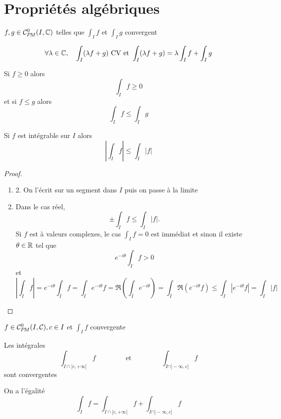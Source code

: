\section{Propriétés algébriques}

\begin{prop}
    \Hyp $f,g\in\CPM(I, \C)$ telles que $\displaystyle \int_If$ et $\displaystyle \int_Ig$ convergent
    \begin{concenum}
    \item \[
            \forall \lambda\in\mathbb C, \quad \int_I(\lambda f+g)\text{ CV  et }\int_I(\lambda f+g)=\lambda\int_If+\int_Ig
        \]
    \item Si $f\geq 0$ alors \[
            \int_If\geq 0
        \]
        et si $f\leq g$ alors \[
            \int_If\leq \int_Ig
        \]
    \item Si $f$ est intégrable sur $I$ alors \[
            \left| \int_If \right|\leq \int_I|f|
        \]
    \end{concenum}
\end{prop}

\begin{proof}~
    \begin{enumerate}
        \item 2. On l'écrit sur un segment dans $I$ puis on passe à la limite
        \setcounter{enumi}{2}
        \item Dans le cas réel, \[
                \pm\int_If\leq \int_I|f|.
            \]
            Si $f$ est à valeurs complexes, le cas $\displaystyle\int_If=0$ est immédiat et sinon il existe $\theta\in\mathbb R$ tel que \[
                e^{-i\theta}\int_If>0
            \]
            et \[
                \left| \int_I f \right|=e^{-i\theta}\int_If=\int_Ie^{-i\theta}f=\Re \left( \int_Ie^{-i\theta} \right)=\int_I\Re(e^{-i\theta}f)\leq \int_I|e^{-i\theta}f|=\int_I|f|
            \]
    \end{enumerate}
\end{proof}

\needspace{5cm}
\begin{prop}
    \Hyp $f\in\CPM(I, \mathcal C), c\in I$ et $\displaystyle\int_If$ convergente
    \begin{concenum}
        \item Les intégrales \[
                \int_{I\cap [c, +\infty[}f\qquad \qquad \text{ et }\qquad \qquad \int_{I\cap ]-\infty, c]}f
            \]
            sont convergentes
        \item On a l'égalité \[
                \int_If=\int_{I\cap [c, +\infty[}f+\int_{I\cap ]-\infty, c]}f
            \]
    \end{concenum}
\end{prop}

